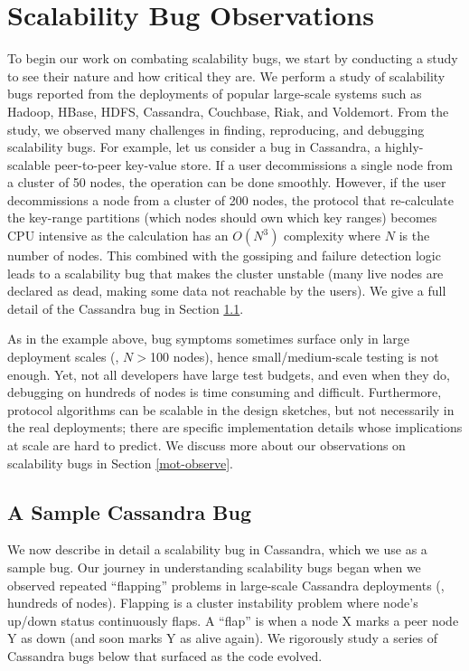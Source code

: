 \section{Scalability Bug Observations}

To begin our work on combating scalability bugs, we start by conducting a study
to see their nature and how critical they are.
%
We perform a study of
\totAll scalability bugs reported from the deployments
of popular large-scale systems such as
Hadoop,
HBase,
HDFS,
Cassandra,
Couchbase,
Riak, and
Voldemort.
%
From the study, we observed many challenges in finding, reproducing, and
debugging scalability bugs. For example, let us consider a bug in Cassandra, a
highly-scalable peer-to-peer key-value store. If a user decommissions a single
node from a cluster of 50 nodes, the operation can be done smoothly. However, if
the user decommissions a node from a cluster of 200 nodes, the protocol that
re-calculate the key-range partitions (which nodes should own which key ranges)
becomes CPU intensive as the calculation has an $O(N^3)$ complexity where $N$ is
the number of nodes.  This combined with the gossiping and failure detection
logic leads to a scalability bug that makes the cluster unstable (many live
nodes are declared as dead, making some data not reachable by the users). We
give a full detail of the Cassandra bug in Section \ref{mot-bug}.

%
As in the example above, bug symptoms sometimes surface only in large deployment
scales (\eg, $N$$>$100 nodes), hence small/medium-scale testing is not enough.
Yet, not all developers have large test budgets, and even when they do,
debugging on hundreds of nodes is time consuming and difficult.
%
Furthermore, protocol algorithms can be scalable in the design sketches, but not
necessarily in the real deployments; there are specific implementation details
whose implications at scale are hard to predict. We discuss more about our
observations on scalability bugs in Section \ref{mot-observe}.

\subsection{A Sample Cassandra Bug}
\label{mot-bug}



We now describe in detail a scalability bug in Cassandra, which we use as a
sample bug.
%
Our journey in understanding scalability bugs began when we observed repeated
``flapping'' problems in large-scale Cassandra deployments (\ie, hundreds of
nodes).
%
Flapping is a cluster instability problem where node's up/down status
continuously flaps.  A ``flap'' is when a node X marks a peer node Y as down
(and soon marks Y as alive again).
%
We rigorously study a series of Cassandra bugs below that surfaced as the code
evolved.

